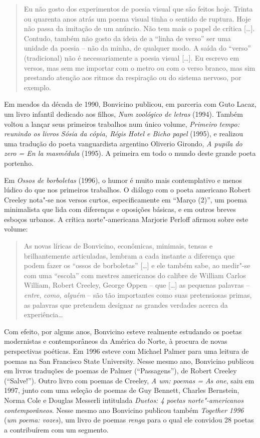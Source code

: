 \begin{quote}
Eu não gosto dos experimentos de poesia visual que são feitos hoje.
Trinta ou quarenta anos atrás um poema visual tinha o sentido de
ruptura. Hoje não passa da imitação de um anúncio. Não tem mais o papel
de crítica {[}\ldots{}{]}. Contudo, também não gosto da ideia de a
``linha de verso'' ser uma unidade da poesia -- não da minha, de
qualquer modo. A saída do ``verso'' (tradicional) não é necessariamente
a poesia visual {[}\ldots{}{]}. Eu escrevo em versos, mas sem me
importar com o metro ou com o verso branco, mas sim prestando atenção
aos ritmos da respiração ou do sistema nervoso, por exemplo.
\end{quote}

Em meados da década de 1990, Bonvicino publicou, em parceria com Guto
Lacaz, um livro infantil dedicado aos filhos, \emph{Num zoológico de
letras} (1994). Também voltou a lançar seus primeiros trabalhos num
único volume, \emph{Primeiro tempo: reunindo os livros Sósia da cópia,
Régis Hotel e Bicho papel} (1995), e realizou uma tradução do poeta
vanguardista argentino Oliverio Girondo, \emph{A pupila do zero = En la
masmédula} (1995). A primeira em todo o mundo deste grande poeta
portenho.

Em \emph{Ossos de borboletas} (1996), o humor é muito mais contemplativo
e menos lúdico do que nos primeiros trabalhos. O diálogo com o poeta
americano Robert Creeley nota"-se nos versos curtos, especificamente em
``Março (2)'', um poema minimalista que lida com diferenças e oposições
básicas, e em outros breves esboços urbanos. A crítica norte"-americana
Marjorie Perloff afirmou sobre este volume:

\begin{quote}
As novas líricas de Bonvicino, econômicas, minimais, tensas e
brilhantemente articuladas, lembram a cada instante a diferença que
podem fazer os ``ossos de borboletas'' {[}\ldots{}{]} e ele também sabe,
ao medir"-se com uma ``escola'' com mestres americanos do calibre de
William Carlos William, Robert Creeley, George Oppen -- que
{[}\ldots{}{]} as pequenas palavras -- \emph{entre}, \emph{como},
\emph{alguém} -- são tão importantes como suas pretensiosas primas, as
palavras que pretendem designar as grandes verdades acerca da
experiência\ldots{}
\end{quote}

Com efeito, por alguns anos, Bonvicino esteve realmente estudando os
poetas modernistas e contemporâneos da América do Norte, à procura de
novas perspectivas poéticas. Em 1996 esteve com Michael Palmer para uma
leitura de poemas na San Francisco State University. Nesse mesmo ano,
Bonvicino publicou em livros traduções de poemas de Palmer
(``Passagens''), de Robert Creeley (``Salve!''). Outro livro com poemas
de Creeley, \emph{A um: poemas = As one}, saiu em 1997, junto com uma
seleção de poemas de Guy Bennett, Charles Bernstein, Norma Cole e
Douglas Messerli intitulada \emph{Duetos: 4 poetas norte"-americanos
contemporâneos}. Nesse mesmo ano Bonvicino publicou também
\emph{Together 1996} (\emph{um poema: vozes}), um livro de poemas
\emph{renga} para o qual ele convidou 28 poetas a contribuírem com um
segmento.


